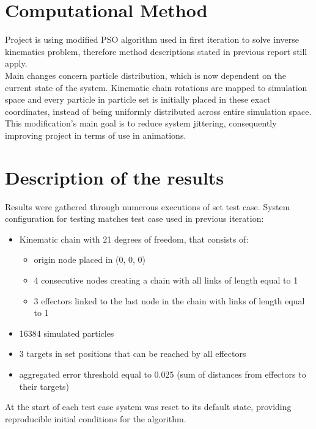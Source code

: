 \documentclass[]{report}
\begin{document}
\chapter*{Computational Method}
\noindent Project is using modified PSO algorithm used in first iteration to solve inverse kinematics problem, therefore method descriptions stated in previous report still apply.\\ 

\noindent Main changes concern particle distribution, which is now dependent on the current state of the system. Kinematic chain rotations are mapped to simulation space and every particle in particle set is initially placed in these exact coordinates, instead of being uniformly distributed across entire simulation space. This modification's main goal is to reduce system jittering, consequently improving project in terms of use in animations.

\chapter*{Description of the results}

\noindent Results were gathered through numerous executions of set test case. System configuration for testing matches test case used in previous iteration:

\begin{itemize}
	\item Kinematic chain with 21 degrees of freedom, that consists of:
	\begin{itemize}
		\item origin node placed in (0, 0, 0)
		\item 4 consecutive nodes creating a chain with all links of length equal to 1
		\item 3 effectors linked to the last node in the chain with links of length equal to 1
	\end{itemize}
	\item 16384 simulated particles
	\item 3 targets in set positions that can be reached by all effectors
	\item aggregated error threshold equal to 0.025 (sum of distances from effectors to their targets)
\end{itemize}

\noindent At the start of each test case system was reset to its default state, providing reproducible initial conditions for the algorithm.\\
\end{document}
